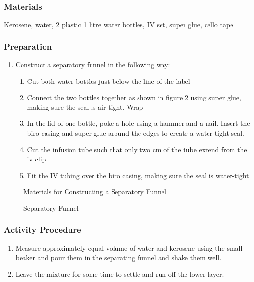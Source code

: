 \subsubsection*{Materials}
Kerosene, water, 2 plastic 1 litre water bottles, IV set, super glue, cello tape

\subsubsection*{Preparation}
\begin{enumerate}
\item{Construct a separatory funnel in the following way:}
\begin{enumerate}
\item{Cut both water bottles just below the line of the label}
\item{Connect the two bottles together as shown in figure \ref{fig:sep-funnel} using super glue, making sure the seal is air tight. Wrap}
\item{In the lid of one bottle, poke a hole using a hammer and a nail. Insert the biro casing and super glue around the edges to create a water-tight seal.}
\item{Cut the infusion tube such that only two cm of the tube extend from the iv clip.}
\item{Fit the IV tubing over the biro casing, making sure the seal is water-tight}
\end{enumerate}
\end{enumerate}

\begin{figure}[h]
\begin{center}
\def\svgwidth{250pt}

\caption{Materials for Constructing a Separatory Funnel}
\label{fig:separating-funnel_materials}
\end{center}
\end{figure}

\begin{figure}[h]
\begin{center}
\def\svgwidth{50pt}

\caption{Separatory Funnel}
\label{fig:sep-funnel}
\end{center}
\end{figure}

\subsubsection*{Activity Procedure}
\begin{enumerate}
\item{Measure approximately equal volume of water and kerosene using the small beaker and pour them in the separating funnel and shake them well.}
\item{Leave the mixture for some time to settle and run off the lower layer.}
\end{enumerate}

